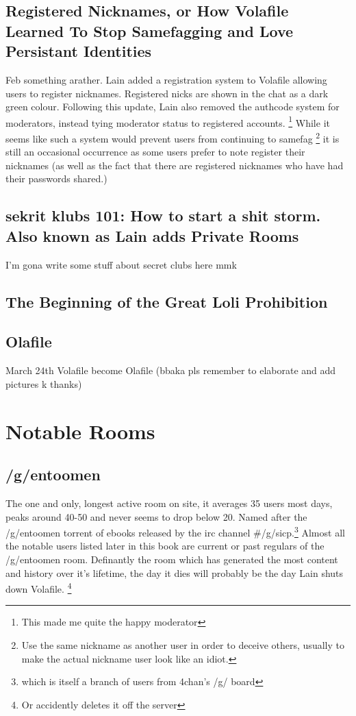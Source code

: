 \documentclass[12pt]{report}
\begin{document}
{\vfill
\pagebreak

\section[Registered Nicknames]{Registered Nicknames, or How Volafile Learned To Stop Samefagging and Love Persistant Identities\footnotemark}
Feb something arather. Lain added a registration system to Volafile allowing users to register nicknames. Registered nicks are shown in the chat as a dark green colour. Following this update, Lain also removed the authcode system for moderators, instead tying moderator status to registered accounts.
	\footnote{This made me quite the happy moderator} While it seems like such a system would prevent users from continuing to samefag
	\footnote{Use the same nickname as another user in order to deceive others, usually to make the actual nickname user look like an idiot.}
 it is still an occasional occurrence as some users prefer to note register their nicknames (as well as the fact that there are registered nicknames who have had their passwords shared.)

\section[sekrit klubs 101]{sekrit klubs 101: How to start a shit storm. Also known as Lain adds Private Rooms}
	I'm gona write some stuff about secret clubs here mmk

\section{The Beginning of the Great Loli Prohibition}
\vfill
\pagebreak



\section{Olafile}
March 24th Volafile become Olafile (bbaka pls remember to elaborate and add pictures k thanks)

\chapter{Notable Rooms}

\section{/g/entoomen}
	The one and only, longest active room on site, it averages 35 users most days, peaks around 40-50 and never seems to drop below 20. Named after the /g/entoomen torrent of ebooks released by the irc channel {\#}/g/sicp.\footnote{which is itself a branch of users from 4chan's /g/ board}
	 Almost all the notable users listed later in this book are current or past regulars of the /g/entoomen room. Definantly the room which has generated the most content and history over it's lifetime, the day it dies will probably be the day Lain shuts down Volafile. \footnote{Or accidently deletes it off the server}

}
\end{document}
